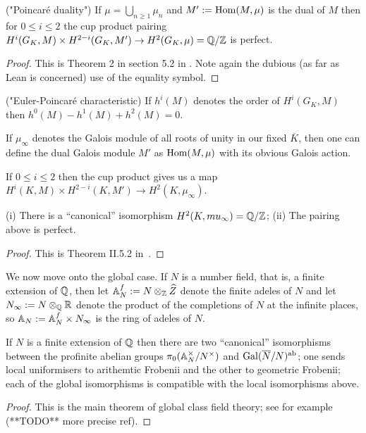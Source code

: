 \begin{theorem} ("Poincar\'e duality") If $\mu=\bigcup_{n\geq1}\mu_n$ and $M':=\operatorname{Hom}(M,\mu)$ is the dual of $M$ then for $0\leq i\leq 2$ the cup product pairing $H^i(G_K,M)\times H^{2-i}(G_K,M')\to H^2(G_K,\mu)=\mathbb{Q}/\mathbb{Z}$ is perfect.
\end{theorem}
\begin{proof} This is Theorem 2 in section 5.2 in \cite{serre-galcoh}. Note again the dubious (as far as Lean is concerned) use of the equality symbol.
\end{proof}

\begin{theorem} ("Euler-Poincar\'e characteristic) If $h^i(M)$ denotes the order of $H^i(G_K,M)$ then $h^0(M)-h^1(M)+h^2(M)=0$.
\end{theorem}

    If $\mu_\infty$ denotes the Galois module of all roots of unity in our fixed $\overline{K}$, then one can define the dual Galois module $M'$ as $\operatorname{Hom}(M,\mu)$ with its obvious Galois action.

If $0\leq i\leq 2$ then the cup product gives us a map $H^i(K,M)\times H^{2-i}(K,M')\to H^2(K,\mu_\infty)$.

\begin{theorem}
    (i) There is a ``canonical'' isomorphism $H^2(K,mu_\infty)=\mathbb{Q}/\mathbb{Z}$;
    (ii) The pairing above is perfect.
\end{theorem}
\begin{proof}
This is Theorem II.5.2 in~\cite{serre-galcoh}.
\end{proof}

We now move onto the global case. If $N$ is a number field, that is, a finite extension of $\mathbb{Q}$,
then let $\mathbb{A}_N^f:= N\otimes_{\mathbb{Z}}\widehat{Z}$
denote the finite adeles of $N$ and let $N_\infty := N\otimes_{\mathbb{Q}}\mathbb{R}$ denote the product of the completions of $N$ at the infinite places, so $\mathbb{A}_N:=\mathbb{A}_N^f\times N_\infty$ is the ring of adeles of $N$.

\begin{theorem} If $N$ is a finite extension of $\mathbb{Q}$ then there are two ``canonical'' isomorphisms between the profinite abelian groups $\pi_0(\mathbb{A}_N^\times/N^\times)$ and $\operatorname{Gal}(\overline{N}/N)^{\operatorname{ab}}$; one sends local uniformisers to arithemtic Frobenii and the other to geometric Frobenii; each of the global isomorphisms is compatible with the local isomorphisms above.
\end{theorem}
\begin{proof} This is the main theorem of global class field theory; see for example~\cite{cf} (**TODO** more precise ref).
\end{proof}


